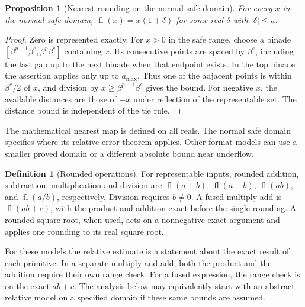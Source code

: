 \documentclass[11pt,oneside,openany]{book}
\theoremstyle{plain}
\newtheorem{proposition}[theorem]{Proposition}
\theoremstyle{definition}
\newtheorem{definition}[theorem]{Definition}
\theoremstyle{remark}
\begin{document}
\begin{proposition}[Nearest rounding on the normal safe domain]
For every \(x\) in the normal safe domain,
\(\operatorname{fl}(x)=x(1+\delta)\) for some real \(\delta\)
with \(|\delta|\le u\).
\end{proposition}
\begin{proof}
Zero is represented exactly. For \(x>0\) in the safe range,
choose a binade
\([\beta^{p-1}\beta^e,\beta^p\beta^e]\) containing \(x\).
Its consecutive points are spaced by \(\beta^e\), including the
last gap up to the next binade when that endpoint exists.
In the top binade the assertion applies only up to \(a_{\max}\).
Thus one of the adjacent points is within \(\beta^e/2\) of \(x\),
and division by \(x\ge\beta^{p-1}\beta^e\) gives the bound.
For negative \(x\), the available distances are those of \(-x\)
under reflection of the representable set. The distance bound
is independent of the tie rule.
\end{proof}

The mathematical nearest map is defined on all reals. The normal
safe domain specifies where its relative-error theorem applies.
Other format models can use a smaller proved domain or a different
absolute bound near underflow.

\begin{definition}[Rounded operations]\label{p206:W02}
For representable inputs, rounded addition, subtraction,
multiplication and division are
\(\operatorname{fl}(a+b)\), \(\operatorname{fl}(a-b)\),
\(\operatorname{fl}(ab)\), and \(\operatorname{fl}(a/b)\),
respectively. Division requires \(b\ne0\).
A fused multiply-add is \(\operatorname{fl}(ab+c)\), with the
product and addition exact before the single rounding.
A rounded square root, when used, acts on a nonnegative
exact argument and applies one rounding to its real square root.
\end{definition}
For these models the relative estimate is a statement about
the exact result of each primitive. In a separate multiply and add,
both the product and the addition require their own range check.
For a fused expression, the range check is on the exact \(ab+c\).
The analysis below may equivalently start with an abstract relative
model on a specified domain if these same bounds are assumed.
\end{document}
